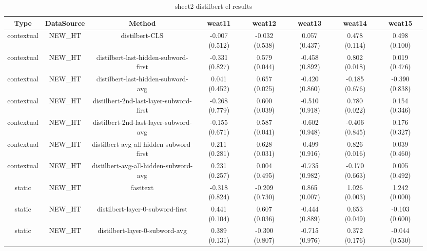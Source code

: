 \begin{sidewaystable}[htb]
    \centering
    \caption{sheet2 distilbert el results}
    \label{appendix_tab:sheet2_distilbert_el_results}
    \small
    \begin{tabular}{@{}cccccccc@{}}
        \toprule
        Type & DataSource & Method & weat11 & weat12 & weat13 & weat14 & weat15 \\
        \midrule
        contextual & NEW\_HT & distilbert-CLS & -0.007 (0.512) & -0.032 (0.538) & 0.057 (0.437) & 0.478 (0.114) & 0.498 (0.100) \\
        contextual & NEW\_HT & distilbert-last-hidden-subword-first & -0.331 (0.827) & 0.579 (0.044) & -0.458 (0.892) & 0.802 (0.018) & 0.019 (0.476) \\
        contextual & NEW\_HT & distilbert-last-hidden-subword-avg & 0.041 (0.452) & 0.657 (0.025) & -0.420 (0.860) & -0.185 (0.676) & -0.390 (0.838) \\
        contextual & NEW\_HT & distilbert-2nd-last-layer-subword-first & -0.268 (0.779) & 0.600 (0.039) & -0.510 (0.918) & 0.780 (0.022) & 0.154 (0.346) \\
        contextual & NEW\_HT & distilbert-2nd-last-layer-subword-avg & -0.155 (0.671) & 0.587 (0.041) & -0.602 (0.948) & -0.406 (0.845) & 0.176 (0.327) \\
        contextual & NEW\_HT & distilbert-avg-all-hidden-subword-first & 0.211 (0.281) & 0.628 (0.031) & -0.499 (0.916) & 0.826 (0.016) & 0.039 (0.460) \\
        contextual & NEW\_HT & distilbert-avg-all-hidden-subword-avg & 0.231 (0.257) & 0.004 (0.495) & -0.735 (0.982) & -0.170 (0.663) & 0.005 (0.492) \\
        static & NEW\_HT & fasttext & -0.318 (0.824) & -0.209 (0.730) & 0.865 (0.007) & 1.026 (0.003) & 1.242 (0.000) \\
        static & NEW\_HT & distilbert-layer-0-subword-first & 0.441 (0.104) & 0.607 (0.036) & -0.444 (0.889) & 0.653 (0.049) & -0.103 (0.600) \\
        static & NEW\_HT & distilbert-layer-0-subword-avg & 0.389 (0.131) & -0.300 (0.807) & -0.715 (0.976) & 0.372 (0.176) & -0.044 (0.530) \\
        \bottomrule
    \end{tabular}
\end{sidewaystable}